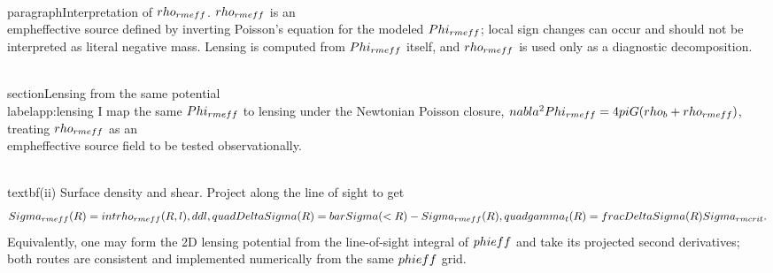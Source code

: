 \documentclass[11pt,a4paper]{article}
\newcommand{\dd}{\mathrm{d}}
\newcommand{\phieff}{\Phi_{\mathrm{eff}}}
\begin{document}
\\paragraph{Interpretation of $\\rho_{\\rm eff}$.}
$\\rho_{\\rm eff}$ is an \\emph{effective} source defined by inverting Poisson’s equation for the modeled $\\Phi_{\\rm eff}$; local sign changes can occur and should not be interpreted as literal negative mass. Lensing is computed from $\\Phi_{\\rm eff}$ itself, and $\\rho_{\\rm eff}$ is used only as a diagnostic decomposition.

\\section{Lensing from the same potential}\\label{app:lensing}
I map the same $\\Phi_{\\rm eff}$ to lensing under the Newtonian Poisson closure,
$\\nabla^2\\Phi_{\\rm eff}=4\\pi G(\\rho_b+\\rho_{\\rm eff})$,
treating $\\rho_{\\rm eff}$ as an \\emph{effective} source field to be tested observationally.

\\textbf{(ii) Surface density and shear.} Project along the line of sight to get
\[
\\Sigma_{\\rm eff}(R)=\\int \\rho_{\\rm eff}(R,l)\\,\\dd l,\\quad
\\Delta\\Sigma(R)=\\bar{\\Sigma}(<R)-\\Sigma_{\\rm eff}(R),\\quad
\\gamma_t(R)=\\frac{\\Delta\\Sigma(R)}{\\Sigma_{\\rm crit}}.
\]
Equivalently, one may form the 2D lensing potential from the line-of-sight integral of $\\phieff$ and take its projected second derivatives; both routes are consistent and implemented numerically from the same $\\phieff$ grid.
\end{document}
